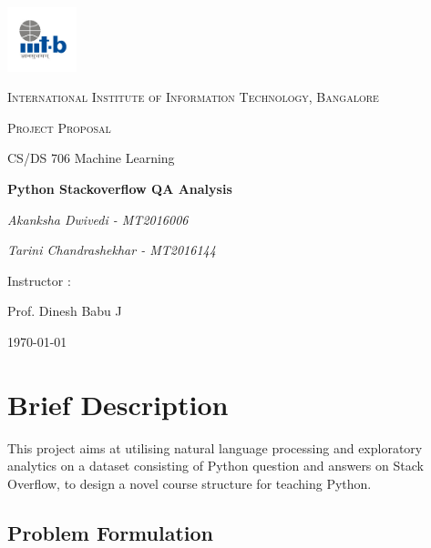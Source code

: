 \documentclass{article}
\begin{document}
\begin{titlepage}
	\centering
	\includegraphics[width=0.15\textwidth]{IIIT-B_logo.jpg}\par\vspace{1cm}
	{\scshape\LARGE International Institute of Information Technology, Bangalore \par}
	\vspace{1cm}
	{\scshape\Large Project Proposal\par}
	{\Large  CS/DS 706 Machine Learning\par}
	\vspace{1.5cm}
	{\huge\bfseries Python Stackoverflow QA Analysis\par}
	\vspace{2cm}
	{\Large\itshape Akanksha Dwivedi - MT2016006\par}
	{\Large\itshape Tarini Chandrashekhar - MT2016144\par}
	\vfill
	Instructor : \par
	Prof. Dinesh Babu J 

	\vfill

	{\large \today\par}
\end{titlepage}

\newpage

\tableofcontents

\newpage
\justify

\section{Brief Description}

This project aims at utilising natural language processing and exploratory analytics on a dataset consisting of Python question and answers on Stack Overflow, to design a novel course structure for teaching Python. 

\subsection{Problem Formulation}
\end{document}
